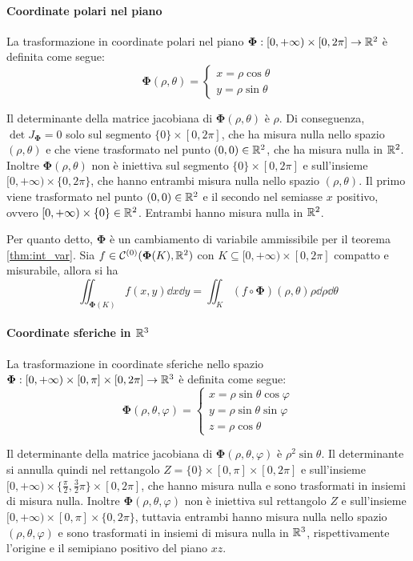 \paragraph{Coordinate polari nel piano}
La trasformazione in coordinate polari nel piano $\bm\Phi:[0,+\infty)\times[0,2\pi]\to\mathbb{R}^2$ è definita come segue:
$$\bm\Phi(\rho,\theta)=
\begin{cases}
    x=\rho \cos \theta\\
    y=\rho \sin \theta
\end{cases}
$$

Il determinante della matrice jacobiana di $\bm\Phi(\rho,\theta)$ è $\rho$. Di conseguenza, $\det J_{\bm\Phi}=0$ solo sul segmento $\{0\}\times[0,2\pi]$, che ha misura nulla nello spazio $(\rho,\theta)$ e che viene trasformato nel punto $(0,0)\in\mathbb{R}^2$, che ha misura nulla in $\mathbb{R}^2$.
Inoltre $\bm\Phi(\rho,\theta)$ non è iniettiva sul segmento $\{0\}\times[0,2\pi]$ e sull'insieme $[0,+\infty)\times\{0,2\pi\}$, che hanno entrambi misura nulla nello spazio $(\rho,\theta)$. Il primo viene trasformato nel punto $(0,0)\in\mathbb{R}^2$ e il secondo nel semiasse $x$ positivo, ovvero $[0,+\infty)\times\{0\} \in \mathbb{R}^2$. Entrambi hanno misura nulla in $\mathbb{R}^2$.

Per quanto detto, $\bm\Phi$ è un cambiamento di variabile ammissibile per il teorema \ref{thm:int_var}. Sia $f\in \mathcal{C}^{(0)}(\bm\Phi(K),\mathbb{R}^2)$ con $K\subseteq[0,+\infty)\times[0,2\pi]$ compatto e misurabile, allora si ha
$$\iint_{\bm\Phi(K)} f(x,y)\dd x \dd y=\iint_K (f\circ \bm\Phi)(\rho,\theta)\rho\dd \rho \dd \theta$$

\paragraph{Coordinate sferiche in $\mathbb{R}^3$}
La trasformazione in coordinate sferiche nello spazio $\bm\Phi:[0,+\infty)\times[0,\pi]\times[0,2\pi] \to \mathbb{R}^3$ è definita come segue:
$$
\bm\Phi(\rho,\theta,\varphi)=
\begin{cases}
    x=\rho\sin\theta\cos\varphi\\
    y=\rho\sin\theta\sin\varphi\\
    z=\rho\cos\theta
\end{cases}
$$

Il determinante della matrice jacobiana di $\bm\Phi(\rho,\theta,\varphi)$ è $\rho^2\sin\theta$. Il determinante si annulla quindi nel rettangolo $Z=\{0\}\times[0,\pi]\times[0,2\pi]$ e sull'insieme $[0,+\infty)\times\{\frac{\pi}{2},\frac{3}{2}\pi\}\times[0,2\pi]$, che hanno misura nulla e sono trasformati in insiemi di misura nulla. Inoltre $\bm\Phi(\rho,\theta,\varphi)$ non è iniettiva sul rettangolo $Z$ e sull'insieme $[0,+\infty)\times[0,\pi]\times\{0,2\pi\}$, tuttavia entrambi hanno misura nulla nello spazio $(\rho,\theta,\varphi)$ e sono trasformati in insiemi di misura nulla in $\mathbb{R}^3$, rispettivamente l'origine e il semipiano positivo del piano $xz$.

